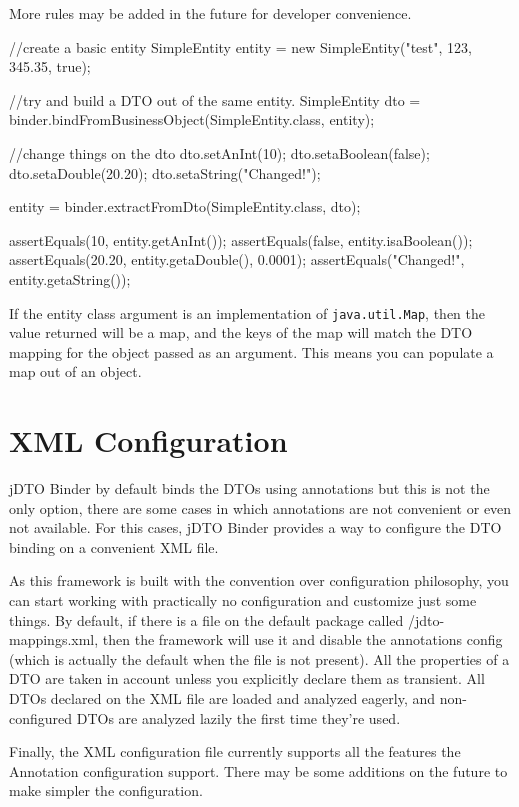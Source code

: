 \documentclass[11pt]{article}
\newcommand{\JDTO}{jDTO Binder\xspace}
\newcommand{\DEFAULTCONFIG}{/jdto-mappings.xml\xspace}
\begin{document}
More rules may be added in the future for developer convenience.

\begin{java}
//create a basic entity
SimpleEntity entity = new SimpleEntity("test", 123, 345.35, true);

//try and build a DTO out of the same entity.
SimpleEntity dto = 
    binder.bindFromBusinessObject(SimpleEntity.class, entity);

//change things on the dto
dto.setAnInt(10);
dto.setaBoolean(false);
dto.setaDouble(20.20);
dto.setaString("Changed!");

entity = binder.extractFromDto(SimpleEntity.class, dto);


assertEquals(10, entity.getAnInt());
assertEquals(false, entity.isaBoolean());
assertEquals(20.20, entity.getaDouble(), 0.0001);
assertEquals("Changed!", entity.getaString());
\end{java}


If the entity class argument is an implementation of \texttt{java.util.Map}, then the value returned will be a map, and the keys of the map will match the DTO mapping for the object passed as an argument. This means you can populate a map out of an object.

\clearpage


\section{XML Configuration}

\JDTO by default binds the DTOs using annotations but this is not the only option, there are some cases in which annotations are not convenient or even not available. For this cases, \JDTO provides a way to configure the DTO binding on a convenient XML file.

As this framework is built with the convention over configuration philosophy, you can start working with practically no configuration and customize just some things. By default, if there is a file on the default package called \DEFAULTCONFIG, then the framework will use it and disable the annotations config (which is actually the default when the file is not present). All the properties of a DTO are taken in account unless you explicitly declare them as transient. All DTOs declared on the XML file are loaded and analyzed eagerly, and non-configured DTOs are analyzed lazily the first time they're used.

Finally, the XML configuration file currently supports all the features the Annotation configuration support. There may be some additions on the future to make simpler the configuration.
\end{document}
